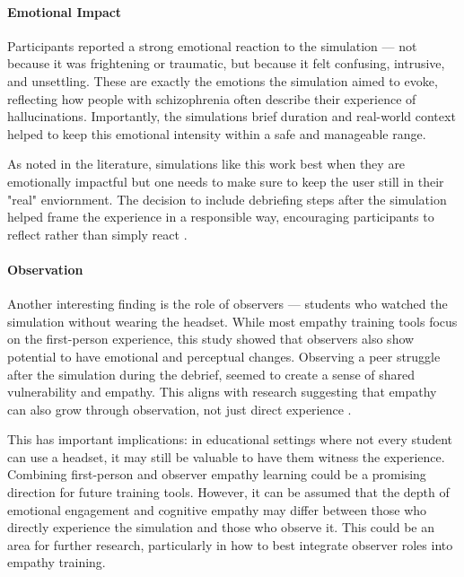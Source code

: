 \paragraph{Emotional Impact}

Participants reported a strong emotional reaction to the simulation — not because it was frightening or traumatic, but because it felt confusing, intrusive, and unsettling. These are exactly the emotions the simulation aimed to evoke, reflecting how people with schizophrenia often describe their experience of hallucinations. Importantly, the simulations brief duration and real-world context helped to keep this emotional intensity within a safe and manageable range.

\vspace{1em}

As noted in the literature, simulations like this work best when they are emotionally impactful but one needs to make sure to keep the user still in their "real" enviornment. The decision to include debriefing steps after the simulation helped frame the experience in a responsible way, encouraging participants to reflect rather than simply react \cite{Rueda2020, Ando2011}.

\paragraph{Observation}

Another interesting finding is the role of observers — students who watched the simulation without wearing the headset. While most empathy training tools focus on the first-person experience, this study showed that observers also show potential to have  emotional and perceptual changes. Observing a peer struggle after the simulation during the debrief, seemed to create a sense of shared vulnerability and empathy. This aligns with research suggesting that empathy can also grow through observation, not just direct experience \cite{Formosa2018}.
\vspace{1em}

This has important implications: in educational settings where not every student can use a headset, it may still be valuable to have them witness the experience. Combining first-person and observer empathy learning could be a promising direction for future training tools. However, it can be assumed that the depth of emotional engagement and cognitive empathy may differ between those who directly experience the simulation and those who observe it. This could be an area for further research, particularly in how to best integrate observer roles into empathy training. 

